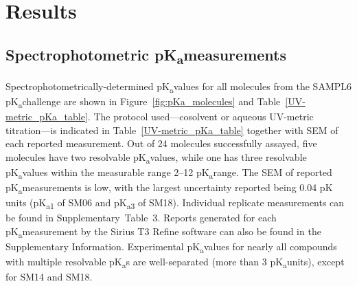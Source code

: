 \documentclass[9pt,lineno]{elife}
\newcommand{\pKa}{pK\textsubscript{a}}
\begin{document}
\section{Results}

\subsection{Spectrophotometric \pKa measurements}
Spectrophotometrically-determined \pKa values for all molecules from the SAMPL6 \pKa challenge are shown in Figure~\ref{fig:pKa_molecules} and Table~\ref{UV-metric_pKa_table}. 
The protocol used---cosolvent or aqueous UV-metric titration---is indicated in Table~\ref{UV-metric_pKa_table} together with SEM of each reported measurement. 
Out of 24 molecules successfully assayed, five molecules have two resolvable \pKa values, while one has three resolvable \pKa values within the measurable range 2--12 \pKa range. 
The SEM of reported \pKa measurements is low, with the largest uncertainty reported being 0.04 pK units (\pKa \textsubscript{1} of SM06 and \pKa \textsubscript{3} of SM18). 
Individual replicate measurements can be found in Supplementary~Table~3. 
Reports generated for each \pKa measurement by the Sirius T3 Refine software can also be found in the Supplementary Information. 
Experimental \pKa values for nearly all compounds with multiple resolvable \pKa s are well-separated (more than 3 \pKa units), except for SM14 and SM18.
\end{document}
